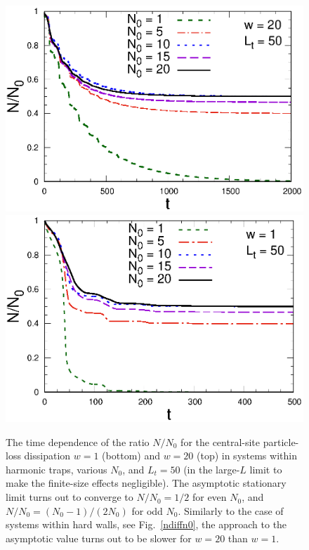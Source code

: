   \begin{figure}[!htb]
\centering
    \includegraphics[width=0.65\columnwidth]{imm/trapNow20.eps}
  \includegraphics[width=0.65\columnwidth]{imm/trapNo.eps}
  \caption{The time dependence of the ratio $N/N_0$ for the central-site
    particle-loss dissipation $w=1$ (bottom) and $w=20$ (top) in systems
    within harmonic traps, various $N_0$, and $L_t=50$ (in the large-$L$
    limit to make the finite-size effects negligible).  The asymptotic
    stationary limit turns out to converge to $N/N_0=1/2$ for even
    $N_0$, and $N/N_0=(N_0-1)/(2N_0)$ for odd $N_0$. Similarly to the
    case of systems within hard walls, see Fig.~\ref{ndiffn0}, the
    approach to the asymptotic value turns out to be slower for $w=20$
    than $w=1$.}
  \label{traptdep}
  \end{figure}
  
